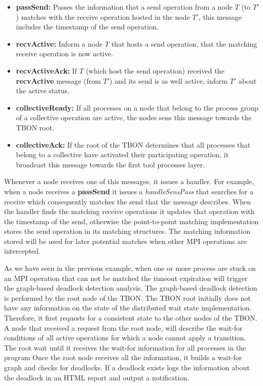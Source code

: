 \begin{refsection}
\begin{itemize}
\item \textbf{passSend:} Passes the information that a send operation from a
  node $T$ (to $T'$) matches with the receive operation hosted in the node $T'$,
  this message includes the timestamp of the send operation.
\item \textbf{recvActive:} Inform a node $T$ that hosts a send operation, that
  the matching receive operation is now active.
\item \textbf{recvActiveAck:} If $T$ (which host the send operation) received
  the \textbf{recvActive} message (from $T'$) and its send is as well active,
  inform $T'$ about the active status.
\item \textbf{collectiveReady:} If all processes on a node that belong to the
  process group of a collective operation are active, the nodes sens this
  message towards the TBON root.
\item \textbf{collectiveAck:} If the root of the TBON determines that all
  processes that belong to a collective have activated their participating
  operation, it broadcast this message towards the first tool processes layer.
\end{itemize}

Whenever a node receives one of this messages, it issues a handler.
%
For example, when a node receives a \textbf{passSend} it issues a
\emph{handleSensPass} that searches for a receive which consequently matches
the send that the message describes.
%
When the handler finds the matching receive operations it updates that
operation with the timestamp of the send, otherwise the point-to-point
matching implementation stores the send operation in its matching structures.
%
The matching information stored will be used for later potential matches when
other MPI operations are intercepted.

As we have seen in the previous example, when one or more process are stuck on
an MPI operation that can not be matched the timeout expiration will trigger
the graph-based deadlock detection analysis.
%
The graph-based deadlock detection is performed by the root node of the TBON.
%
The TBON root initially does not have any information on the state of the
distributed wait state implementation.
%
Therefore, it first requests for a consistent state to the other nodes of the
TBON.
%
A node that received a request from the root node, will describe the wait-for
conditions of all active operations for which a node cannot apply a
transition.
%
The root wait until it receives the wait-for information for all processes in
the program
%
Once the root node receives all the information, it builds a wait-for graph
and checks for deadlocks.
%
If a deadlock exists logs the information about the deadlock in an HTML report
and output a notification.


\end{refsection}
